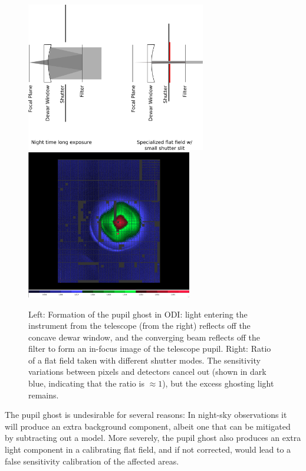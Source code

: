 \documentclass[]{spieman}
\begin{document}
\begin{figure}
\centering
\includegraphics[height=6.5cm]{images/odishutterpupilghostsupression.png}
\hspace{0.75cm} \includegraphics[height=6.5cm]{images/odi_layeronepg.png}
	
\caption{ \label{fig_pupilghost}Left: Formation of the pupil ghost in ODI: 
    light entering the instrument from the telescope (from the right) reflects off
    the concave dewar window, and the converging beam reflects off the filter to form
    an in-focus image of the telescope pupil. Right: Ratio of a flat field taken
    with different shutter modes. The sensitivity variations between pixels and
    detectors cancel out (shown in dark blue, indicating that the ratio is $\approx 1$),
    but the excess ghosting light remains.}
\end{figure}

The pupil ghost is undesirable for several reasons: In night-sky observations it
will produce an extra background component, albeit one that can be mitigated by
subtracting out a model. More severely, the pupil ghost also produces an extra
light component in a calibrating flat field, and if not corrected, would lead to
a false sensitivity calibration of the affected areas.
\end{document}
